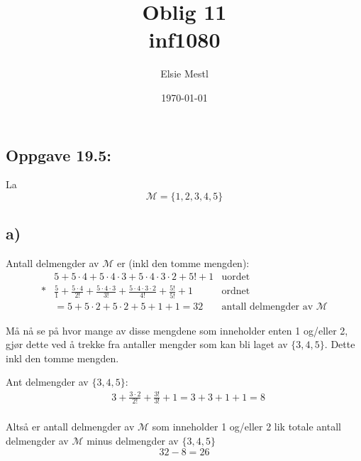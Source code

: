 \documentclass[a4paper, norsk, 10pt]{article}
\date{\today}
\title{Oblig 11 \\ inf1080}
\author{Elsie Mestl}
\begin{document}
\maketitle
\begin{flushleft}

  \section*{Oppgave 19.5:}

  La \[\mathcal{M} =  \{1,2,3,4,5\}\]

  \subsection*{a)}

  Antall delmengder av $\mathcal{M}$ er (inkl den tomme mengden):
  \begin{align*}
    &5 + 5\cdot4 + 5\cdot 4 \cdot 3 + 5\cdot 4\cdot 3 \cdot 2 + 5! +1  &\text{uordet}\\*
    &\frac{5}{1} + \frac{5\cdot 4}{2!} + \frac{5\cdot 4 \cdot 3}{3!} + \frac{5 \cdot 4 \cdot 3 \cdot 2 }{4!} + \frac{5!}{5!}+1 &\text{ordnet}\\
    &=  5 + 5\cdot 2 + 5\cdot2 + 5 + 1 + 1= 32 &\text{antall delmengder av $\mathcal{M}$}    
  \end{align*}

  Må nå se på hvor mange av disse mengdene som inneholder enten 1 og/eller 2, gjør dette ved å trekke fra antaller mengder som kan bli laget av $\{3,4,5\}$. Dette inkl den tomme mengden.

  Ant delmengder av $\{3,4,5\}$:
  \begin{align*}
    &3 + \frac{3 \cdot 2}{2!} + \frac{3!}{3!} + 1= 3 + 3 + 1 +1 = 8\\
  \end{align*}

  Altså er antall delmengder av $\mathcal{M}$ som inneholder 1 og/eller 2 lik totale antall delmengder av $\mathcal{M}$ minus delmengder av $\{3,4,5\}$
  \[32 -8 = 26\]

  

\end{flushleft}
\end{document}
